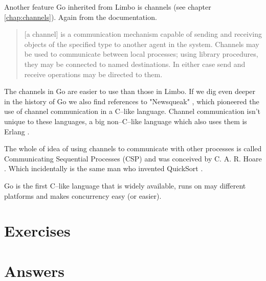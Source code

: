 Another feature Go inherited from Limbo is channels (see chapter
\ref{chap:channels}). Again from the documentation.
\begin{quote}
[a channel] is a communication mechanism capable of sending and receiving objects of
the specified type to another agent in the system. Channels may be used
to communicate between local processes; using library procedures, they
may be connected to named destinations. In either case send and receive
operations may be directed to them.
\end{quote}
The channels in Go are easier to use than those in Limbo.
If we dig even deeper in the history of Go we also find references
to "Newsqueak" \cite{newsqueak}, which pioneered the use of 
channel communication in a C--like language. Channel
communication isn't unique to these languages, a big non--C--like
language which also uses them is Erlang \cite{erlang}.

The whole of idea of using channels to communicate with other processes
is called Communicating Sequential Processes (CSP) and was conceived
by C. A. R. Hoare \cite{hoare}. Which incidentally is the same man who
invented QuickSort \cite{Quicksort}.

\begin{lbar}
\noindent{}Go is the first C--like language that is widely available, runs on may
different platforms and makes concurrency easy (or easier).
\end{lbar}

\section{Exercises}


\cleardoublepage
\section{Answers}
\shipoutAnswer
